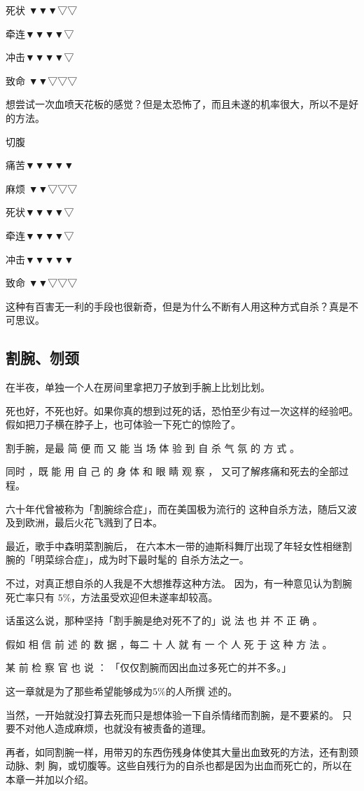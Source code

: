 \documentclass[UTF8]{ctexart}
\begin{document}
死状 ▼▼▼▽▽

牵连▼▼▼▼▽

冲击▼▼▼▼▽

致命 ▼▼▽▽▽

想尝试一次血喷天花板的感觉？但是太恐怖了，而且未遂的机率很大，所以不是好的方法。

切腹

痛苦▼▼▼▼▼

麻烦 ▼▼▽▽▽

死状▼▼▼▼▽

牵连▼▼▼▼▽

冲击▼▼▼▼▼

致命 ▼▼▽▽▽

这种有百害无一利的手段也很新奇，但是为什么不断有人用这种方式自杀？真是不可思议。

\subsection*{割腕、刎颈}

在半夜，单独一个人在房间里拿把刀子放到手腕上比划比划。

死也好，不死也好。如果你真的想到过死的话，恐怕至少有过一次这样的经验吧。假如把刀子横在脖子上，也可体验一下死亡的惊险了。

割手腕，是最 简 便 而 又 能 当 场 体 验 到 自 杀 气 氛 的 方 式 。

同时 ，既 能 用 自 己 的 身 体 和 眼 睛 观 察 ， 又可了解疼痛和死去的全部过程。

六十年代曾被称为「割腕综合症」，而在美国极为流行的
这种自杀方法，随后又波及到欧洲，最后火花飞溅到了日本。

最近，歌手中森明菜割腕后， 在六本木一带的迪斯科舞厅出现了年轻女性相继割腕的「明菜综合症」，成为时下最时髦的 自杀方法之一。

不过，对真正想自杀的人我是不大想推荐这种方法。
因为，有一种意见认为割腕死亡率只有 $5\%$，方法虽受欢迎但未遂率却较高。

话虽这么说，那种坚持「割手腕是绝对死不了的」说 法 也 并 不 正 确 。

假如 相 信 前 述 的 数 据 ，每二 十 人 就 有 一 个 人 死 于 这 种 方 法 。

某 前 检 察 官 也 说 ： 「仅仅割腕而因出血过多死亡的并不多。」

这一章就是为了那些希望能够成为$5\%$的人所撰 述的。

当然，一开始就没打算去死而只是想体验一下自杀情绪而割腕，是不要紧的。
只要不对他人造成麻烦，也就没有被责备的道理。

再者，如同割腕一样，用带刃的东西伤残身体使其大量出血致死的方法，还有割颈动脉、刺
胸，或切腹等。这些自残行为的自杀也都是因为出血而死亡的，所以在本章一并加以介绍。
\end{document}
